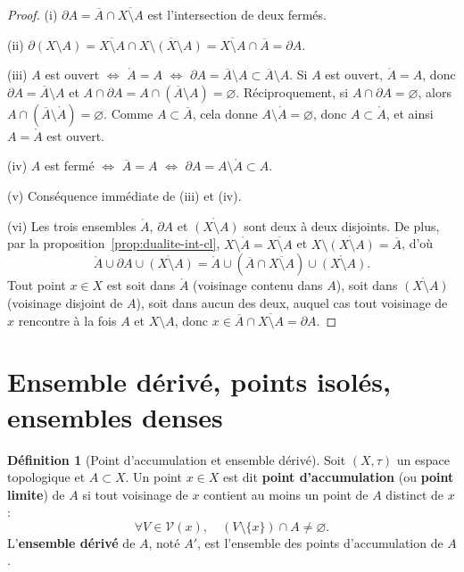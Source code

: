 \documentclass[12pt,a4paper,openany]{book}
\theoremstyle{definition}
\newtheorem{definition}{Définition}[chapter]
\theoremstyle{cours}
\theoremstyle{coursnormal}
\newcommand{\Int}[1]{\mathring{#1}}
\newcommand{\Cl}[1]{\overline{#1}}
\newcommand{\Fr}[1]{\partial #1}
\newcommand{\Vois}[1]{\mathcal{V}(#1)}
\begin{document}
\begin{proof}
  (i) $\Fr{A} = \Cl{A} \cap \Cl{X \setminus A}$ est l'intersection de deux fermés.

  (ii) $\Fr{(X \setminus A)} = \Cl{X \setminus A} \cap \Cl{X \setminus (X \setminus A)} = \Cl{X \setminus A} \cap \Cl{A} = \Fr{A}$.

  (iii) $A$ est ouvert $\Leftrightarrow$ $\Int{A} = A$ $\Leftrightarrow$ $\Fr{A} = \Cl{A} \setminus A \subset \Cl{A} \setminus A$. Si $A$ est ouvert, $\Int{A} = A$, donc $\Fr{A} = \Cl{A} \setminus A$ et $A \cap \Fr{A} = A \cap (\Cl{A} \setminus A) = \varnothing$. Réciproquement, si $A \cap \Fr{A} = \varnothing$, alors $A \cap (\Cl{A} \setminus \Int{A}) = \varnothing$. Comme $A \subset \Cl{A}$, cela donne $A \setminus \Int{A} = \varnothing$, donc $A \subset \Int{A}$, et ainsi $A = \Int{A}$ est ouvert.

  (iv) $A$ est fermé $\Leftrightarrow$ $\Cl{A} = A$ $\Leftrightarrow$ $\Fr{A} = A \setminus \Int{A} \subset A$.

  (v) Conséquence immédiate de (iii) et (iv).

  (vi) Les trois ensembles $\Int{A}$, $\Fr{A}$ et $\Int{(X \setminus A)}$ sont deux à deux disjoints. De plus, par la proposition~\ref{prop:dualite-int-cl}, $X \setminus \Int{A} = \Cl{X \setminus A}$ et $X \setminus \Int{(X \setminus A)} = \Cl{A}$, d'où
  \[
    \Int{A} \cup \Fr{A} \cup \Int{(X \setminus A)} = \Int{A} \cup (\Cl{A} \cap \Cl{X \setminus A}) \cup \Int{(X \setminus A)}.
  \]
  Tout point $x \in X$ est soit dans $\Int{A}$ (voisinage contenu dans $A$), soit dans $\Int{(X \setminus A)}$ (voisinage disjoint de $A$), soit dans aucun des deux, auquel cas tout voisinage de $x$ rencontre à la fois $A$ et $X \setminus A$, donc $x \in \Cl{A} \cap \Cl{X \setminus A} = \Fr{A}$.
\end{proof}

\section{Ensemble dérivé, points isolés, ensembles denses}
\label{sec:derive-dense}

\begin{definition}[Point d'accumulation et ensemble dérivé]\label{def:derive}
  Soit $(X,\tau)$ un espace topologique et $A \subset X$. Un point $x \in X$ est dit \textbf{point d'accumulation} (ou \textbf{point limite}) de $A$ si tout voisinage de $x$ contient au moins un point de $A$ distinct de $x$ :
  \[
    \forall V \in \Vois{x},\quad (V \setminus \{x\}) \cap A \neq \varnothing.
  \]
  L'\textbf{ensemble dérivé} de $A$, noté $A'$, est l'ensemble des points d'accumulation de $A$.
\end{definition}
\end{document}

